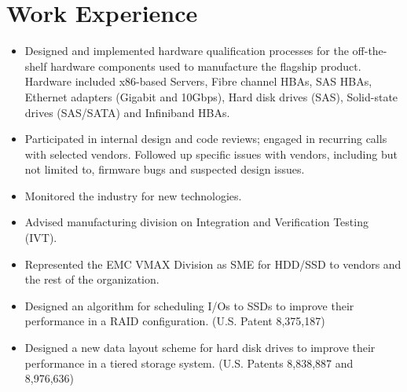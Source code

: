 \section{Work Experience}

{
	\begin{itemize}
		\item Designed and implemented hardware qualification processes for the
			off-the-shelf hardware components used to manufacture the flagship
			product. Hardware included x86-based Servers, Fibre channel HBAs,
			SAS HBAs, Ethernet adapters (Gigabit and 10Gbps), Hard disk drives (SAS),
			Solid-state drives (SAS/SATA) and Infiniband HBAs.
		\item Participated in internal design and code reviews; engaged in
			recurring calls with selected vendors. Followed up specific issues 
			with vendors, including but not limited to, firmware bugs and
			suspected design issues.
		\item  Monitored the industry for new technologies.
		\item Advised manufacturing division on Integration and Verification Testing (IVT).
	\end{itemize}
}
{
	\begin{itemize}
		\item Represented the EMC VMAX Division as SME for HDD/SSD to vendors
			and the rest of the organization.
		\item Designed an algorithm for scheduling I/Os to SSDs to improve
			their performance in a RAID configuration. (U.S. Patent 8,375,187)
		\item Designed a new data layout scheme for hard disk drives to improve
			their performance in a tiered storage system. (U.S. Patents 8,838,887 and 8,976,636)
	\end{itemize}
}
